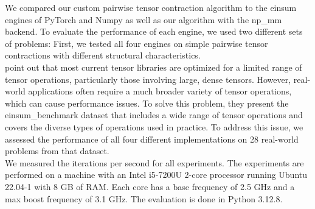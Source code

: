 We compared our custom pairwise tensor contraction algorithm to the einsum engines of PyTorch and Numpy as well as our algorithm with the np\_mm backend. To evaluate the performance of each engine, we used two different sets of problems: First, we tested all four engines on simple pairwise tensor contractions with different structural characteristics. \\
\textcite{blacher2024einsum} point out that most current tensor libraries are optimized for a limited range of tensor operations, particularly those involving large, dense tensors. However, real-world applications often require a much broader variety of tensor operations, which can cause performance issues. To solve this problem, they present the einsum\_benchmark dataset that includes a wide range of tensor operations and covers the diverse types of operations used in practice. To address this issue, we assessed the performance of all four different implementations on 28 real-world problems from that dataset.\\
We measured the iterations per second for all experiments. The experiments are performed on a machine with
an Intel i5-7200U 2-core processor running Ubuntu 22.04-1 with 8 GB of RAM.
Each core has a base frequency of 2.5 GHz and a max boost frequency of 3.1 GHz. The evaluation is done in
Python 3.12.8.

